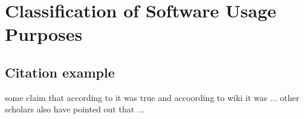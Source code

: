 \section{Classification of Software Usage Purposes }
\subsection{Citation example}

some claim \cite{goble2014better} that according to \cite{hannay2009scientists} it was true and accoording to wiki \cite{enwiki:1056292826} it  was ... other scholars also have pointed out that ... \cite{wilson2014best}
\clearpage